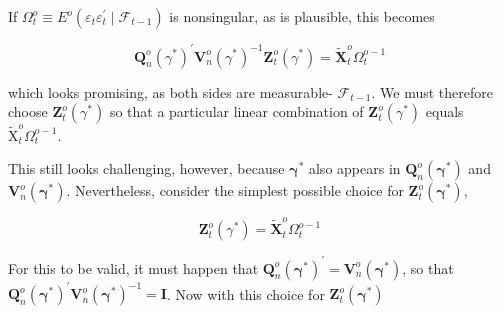\documentclass[10pt]{article}
\begin{document}
If $\Omega_{t}^{o} \equiv E^{o}\left(\varepsilon_{t} \varepsilon_{t}^{\prime} \mid \mathcal{F}_{t-1}\right)$ is nonsingular, as is plausible, this becomes

$$
\mathbf{Q}_{n}^{o}\left(\gamma^{*}\right)^{\prime} \mathbf{V}_{n}^{o}\left(\gamma^{*}\right)^{-1} \mathbf{Z}_{t}^{o}\left(\gamma^{*}\right)=\tilde{\mathbf{X}}_{t}^{o} \Omega_{t}^{o-1}
$$

which looks promising, as both sides are measurable- $\mathcal{F}_{t-1}$. We must therefore choose $\mathbf{Z}_{t}^{o}\left(\gamma^{*}\right)$ so that a particular linear combination of $\mathbf{Z}_{t}^{o}\left(\gamma^{*}\right)$ equals $\tilde{\mathrm{X}}_{t}^{o} \Omega_{t}^{o-1}$.

This still looks challenging, however, because $\boldsymbol{\gamma}^{*}$ also appears in $\mathbf{Q}_{n}^{o}\left(\boldsymbol{\gamma}^{*}\right)$ and $\mathbf{V}_{n}^{o}\left(\boldsymbol{\gamma}^{*}\right)$. Nevertheless, consider the simplest possible choice for $\mathbf{Z}_{t}^{o}\left(\boldsymbol{\gamma}^{*}\right)$,

$$
\mathbf{Z}_{t}^{o}\left(\gamma^{*}\right)=\tilde{\mathbf{X}}_{t}^{o} \Omega_{t}^{o-1}
$$

For this to be valid, it must happen that $\mathbf{Q}_{n}^{o}\left(\boldsymbol{\gamma}^{*}\right)^{\prime}=\mathbf{V}_{n}^{o}\left(\boldsymbol{\gamma}^{*}\right)$, so that $\mathbf{Q}_{n}^{o}\left(\boldsymbol{\gamma}^{*}\right)^{\prime} \mathbf{V}_{n}^{o}\left(\boldsymbol{\gamma}^{*}\right)^{-1}=\mathbf{I}$. Now with this choice for $\mathbf{Z}_{t}^{o}\left(\boldsymbol{\gamma}^{*}\right)$
\end{document}
